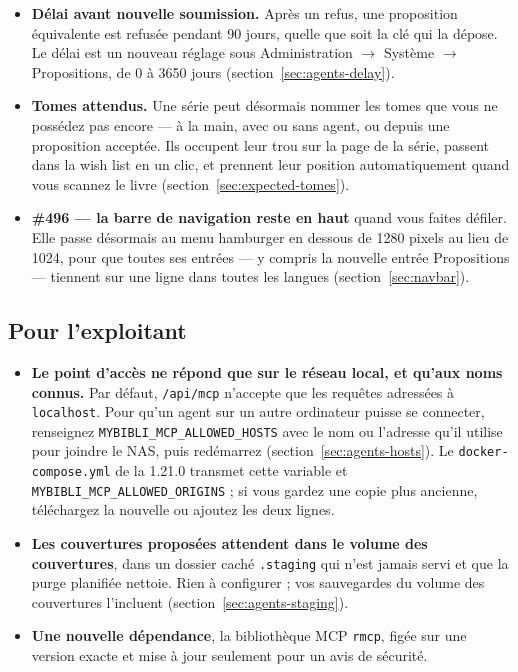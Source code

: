 \begin{itemize}
  \item \textbf{Délai avant nouvelle soumission.} Après un refus, une
        proposition équivalente est refusée pendant 90 jours, quelle
        que soit la clé qui la dépose. Le délai est un nouveau réglage
        sous Administration \(\rightarrow\) Système \(\rightarrow\)
        Propositions, de 0 à 3650 jours
        (section~\ref{sec:agents-delay}).
  \item \textbf{Tomes attendus.} Une série peut désormais nommer les
        tomes que vous ne possédez pas encore --- à la main, avec ou
        sans agent, ou depuis une proposition acceptée. Ils occupent
        leur trou sur la page de la série, passent dans la wish list en
        un clic, et prennent leur position automatiquement quand vous
        scannez le livre (section~\ref{sec:expected-tomes}).
  \item \textbf{\#496 \string— la barre de navigation reste en haut}
        quand vous faites défiler. Elle passe désormais au menu
        hamburger en dessous de 1280 pixels au lieu de 1024, pour que
        toutes ses entrées --- y compris la nouvelle entrée
        Propositions --- tiennent sur une ligne dans toutes les langues
        (section~\ref{sec:navbar}).
\end{itemize}

\subsection*{Pour l'exploitant}

\begin{itemize}
  \item \textbf{Le point d'accès ne répond que sur le réseau local, et
        qu'aux noms connus.} Par défaut, \texttt{/api/mcp} n'accepte
        que les requêtes adressées à \texttt{localhost}. Pour qu'un
        agent sur un autre ordinateur puisse se connecter, renseignez
        \texttt{MYBIBLI\_MCP\_ALLOWED\_HOSTS} avec le nom ou l'adresse
        qu'il utilise pour joindre le NAS, puis redémarrez
        (section~\ref{sec:agents-hosts}). Le \texttt{docker-compose.yml}
        de la 1.21.0 transmet cette variable et
        \texttt{MYBIBLI\_MCP\_ALLOWED\_ORIGINS} ; si vous gardez une
        copie plus ancienne, téléchargez la nouvelle ou ajoutez les
        deux lignes.
  \item \textbf{Les couvertures proposées attendent dans le volume des
        couvertures}, dans un dossier caché \texttt{.staging} qui n'est
        jamais servi et que la purge planifiée nettoie. Rien à
        configurer ; vos sauvegardes du volume des couvertures
        l'incluent (section~\ref{sec:agents-staging}).
  \item \textbf{Une nouvelle dépendance}, la bibliothèque MCP
        \texttt{rmcp}, figée sur une version exacte et mise à jour
        seulement pour un avis de sécurité.
\end{itemize}


